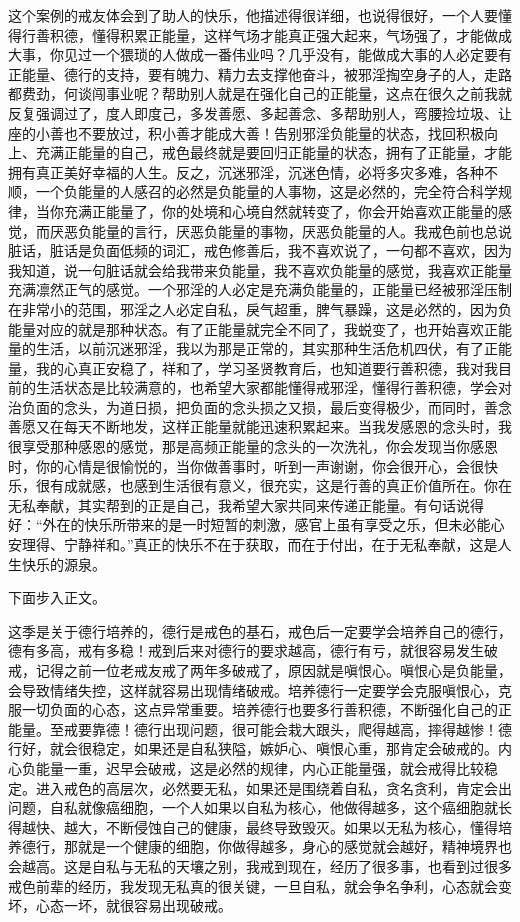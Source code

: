 \begin{case}
    这个案例的戒友体会到了助人的快乐，他描述得很详细，也说得很好，一个人要懂得行善积德，懂得积累正能量，这样气场才能真正强大起来，气场强了，才能做成大事，你见过一个猥琐的人做成一番伟业吗？几乎没有，能做成大事的人必定要有正能量、德行的支持，要有魄力、精力去支撑他奋斗，被邪淫掏空身子的人，走路都费劲，何谈闯事业呢？帮助别人就是在强化自己的正能量，这点在很久之前我就反复强调过了，度人即度己，多发善愿、多起善念、多帮助别人，弯腰捡垃圾、让座的小善也不要放过，积小善才能成大善！告别邪淫负能量的状态，找回积极向上、充满正能量的自己，戒色最终就是要回归正能量的状态，拥有了正能量，才能拥有真正美好幸福的人生。反之，沉迷邪淫，沉迷色情，必将多灾多难，各种不顺，一个负能量的人感召的必然是负能量的人事物，这是必然的，完全符合科学规律，当你充满正能量了，你的处境和心境自然就转变了，你会开始喜欢正能量的感觉，而厌恶负能量的言行，厌恶负能量的事物，厌恶负能量的人。我戒色前也总说脏话，脏话是负面低频的词汇，戒色修善后，我不喜欢说了，一句都不喜欢，因为我知道，说一句脏话就会给我带来负能量，我不喜欢负能量的感觉，我喜欢正能量充满凛然正气的感觉。一个邪淫的人必定是充满负能量的，正能量已经被邪淫压制在非常小的范围，邪淫之人必定自私，戾气超重，脾气暴躁，这是必然的，因为负能量对应的就是那种状态。有了正能量就完全不同了，我蜕变了，也开始喜欢正能量的生活，以前沉迷邪淫，我以为那是正常的，其实那种生活危机四伏，有了正能量，我的心真正安稳了，祥和了，学习圣贤教育后，也知道要行善积德，我对我目前的生活状态是比较满意的，也希望大家都能懂得戒邪淫，懂得行善积德，学会对治负面的念头，为道日损，把负面的念头损之又损，最后变得极少，而同时，善念善愿又在每天不断地发，这样正能量就能迅速积累起来。当我发感恩的念头时，我很享受那种感恩的感觉，那是高频正能量的念头的一次洗礼，你会发现当你感恩时，你的心情是很愉悦的，当你做善事时，听到一声谢谢，你会很开心，会很快乐，很有成就感，也感到生活很有意义，很充实，这是行善的真正价值所在。你在无私奉献，其实帮到的正是自己，我希望大家共同来传递正能量。有句话说得好：“外在的快乐所带来的是一时短暂的刺激，感官上虽有享受之乐，但未必能心安理得、宁静祥和。”真正的快乐不在于获取，而在于付出，在于无私奉献，这是人生快乐的源泉。
\end{case}

下面步入正文。

这季是关于德行培养的，德行是戒色的基石，戒色后一定要学会培养自己的德行，德有多高，戒有多稳！戒到后来对德行的要求越高，德行有亏，就很容易发生破戒，记得之前一位老戒友戒了两年多破戒了，原因就是嗔恨心。嗔恨心是负能量，会导致情绪失控，这样就容易出现情绪破戒。培养德行一定要学会克服嗔恨心，克服一切负面的心态，这点异常重要。培养德行也要多行善积德，不断强化自己的正能量。至戒要靠德！德行出现问题，很可能会栽大跟头，爬得越高，摔得越惨！德行好，就会很稳定，如果还是自私狭隘，嫉妒心、嗔恨心重，那肯定会破戒的。内心负能量一重，迟早会破戒，这是必然的规律，内心正能量强，就会戒得比较稳定。进入戒色的高层次，必然要无私，如果还是围绕着自私，贪名贪利，肯定会出问题，自私就像癌细胞，一个人如果以自私为核心，他做得越多，这个癌细胞就长得越快、越大，不断侵蚀自己的健康，最终导致毁灭。如果以无私为核心，懂得培养德行，那就是一个健康的细胞，你做得越多，身心的感觉就会越好，精神境界也会越高。这是自私与无私的天壤之别，我戒到现在，经历了很多事，也看到过很多戒色前辈的经历，我发现无私真的很关键，一旦自私，就会争名争利，心态就会变坏，心态一坏，就很容易出现破戒。

